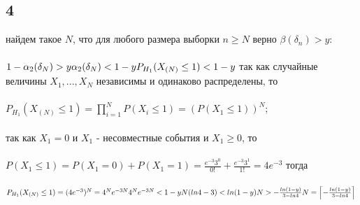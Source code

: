 \documentclass{article}
\begin{document}
\begin{large}
	\section*{4}
	найдем такое $N$, что для любого размера выборки $n\ge N$ верно $\beta(\delta_n)>y$:\\\\
	$
	1-\alpha_2(\delta_N)>y\\\\
	\alpha_2(\delta_N)<1-y\\\\
	P_{H_1}(X_{(N)}\le 1)<1-y\\\\
	$
	так как случайные величины $X_1,...,X_N$ независимы и одинаково распределены, то\\\\
	$P_{H_1}(X_{(N)}\le 1)=\prod_{i=1}^{N}P(X_i\le 1)=(P(X_1\le 1))^N$;\\\\
	так как $X_1=0$ и $X_1$ - несовместные события и $X_1\ge 0$, то\\\\
	$P(X_1\le 1)=P(X_1=0)+P(X_1=1)=\frac{e^{-3}3^0}{0!}+\frac{e^{-3}3^1}{1!}=4e^{-3}$
	тогда\\\\
	$
	P_{H_1}(X_{(N)}\le 1)=(4e^{-3})^N=4^Ne^{-3N}\\\\
	4^Ne^{-3N}<1-y\\\\
	N(ln4-3)<ln(1-y)\\\\
	N>-\frac{ln(1-y)}{3-ln4}\\\\
	N=\left \lceil{-\frac{ln(1-y)}{3-ln4}}\right \rceil\\\\
	$
	\end{large}
\end{document}
